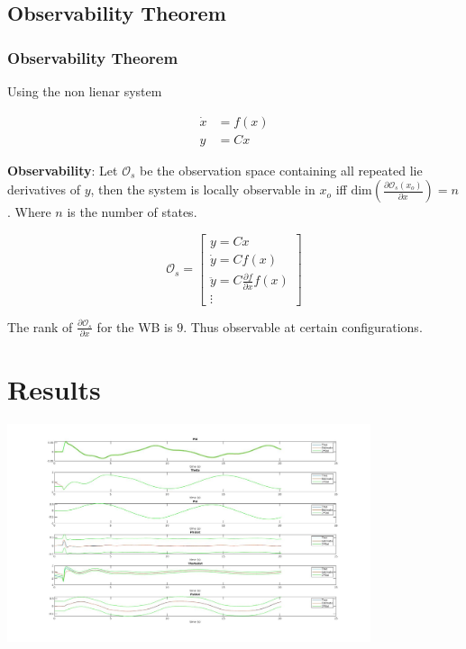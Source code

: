 \documentclass[10pt]{beamer}
\begin{document}


\subsection{Observability Theorem}

\begin{frame}

\frametitle{Observability Theorem}

Using the non lienar system 

  \begin{align*}
  \dot{x} &= f(x)\\
  y &= Cx 
  \end{align*}


\textbf{Observability}: Let $\mathcal{O}_s$ be the observation space containing all repeated lie derivatives of $y$, then the system is locally observable in $x_o$ iff $\text{dim}(\frac{\partial{\mathcal{O}_s(x_o)}}{\partial x}) = n$. Where $n$ is the number of states. 

$$\mathcal{O}_s = 
\begin{bmatrix}
y = Cx\\
\dot{y}  = Cf(x)\\
\ddot{y} = C\frac{\partial f}{\partial x}f(x)\\
\vdots
\end{bmatrix}
$$

The rank of $\frac{\partial \mathcal{O}_s}{\partial x}$ for the WB is $9$. Thus observable at certain configurations. 


\end{frame}



\section{Results}
\begin{frame}
\includegraphics[width=0.8\textwidth,height=0.8\textheight]{images/states.jpg}
\end{frame}
\end{document}
